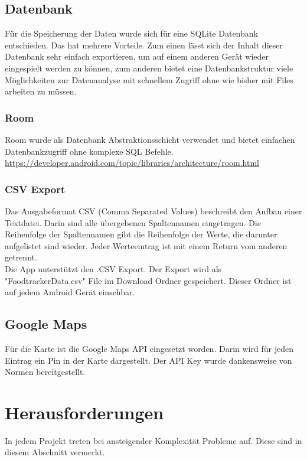 \documentclass[
    DIV12,
    cleardouble=plain,
    headings=normal,
    pdftex,
    headexclude,footexclude,
    final
]{scrreprt}
\begin{document}
\section{Datenbank}
Für die Speicherung der Daten wurde sich für eine SQLite Datenbank entschieden. Das hat mehrere Vorteile. Zum einen lässt sich der Inhalt dieser Datenbank sehr einfach exportieren, um auf einem anderen Gerät wieder eingespielt werden zu können, zum anderen bietet eine Datenbankstruktur viele Möglichkeiten zur Datenanalyse mit schnellem Zugriff ohne wie bisher mit Files arbeiten zu müssen.

\subsection{Room}
Room wurde als Datenbank Abstraktionsschicht verwendet und bietet einfachen Datenbankzugriff ohne komplexe SQL Befehle.
\url{https://developer.android.com/topic/libraries/architecture/room.html}


\subsection{CSV Export}
Das Ausgabeformat CSV (Comma Separated Values) beschreibt den Aufbau einer Textdatei. Darin sind alle übergebenen Spaltennamen eingetragen. Die Reihenfolge der Spaltennamen gibt die Reihenfolge der Werte, die darunter aufgelistet sind wieder. Jeder Werteeintrag ist mit einem Return vom anderen getrennt.\\
Die App unterstützt den .CSV Export. Der Export wird als "FoodtrackerData.csv" File im Download Ordner gespeichert.
Dieser Ordner ist auf jedem Android Gerät einsehbar.



\section{Google Maps}
Für die Karte ist die Google Maps API eingesetzt worden. Darin wird für jeden Eintrag ein Pin in der Karte dargestellt.
Der API Key wurde dankensweise von Normen bereitgestellt.





\newpage

\chapter{Herausforderungen}
In jedem Projekt treten bei ansteigender Komplexität Probleme auf. Diese sind in diesem Abschnitt vermerkt.
\end{document}
